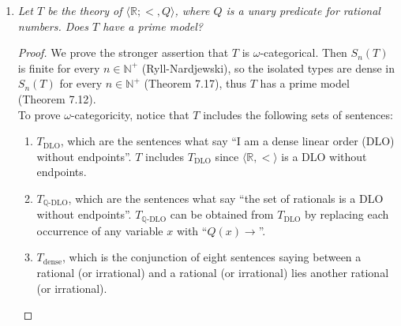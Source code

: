 \documentclass{article}
\begin{document}
\begin{enumerate}[label={\bf Q\arabic*:}]
\begin{proof}
      In particular, we show that $\varphi$ holds in
      $\overline{\mathbb{F}}_p$, the algebraic-closure of the field
      $\mathbb{F}_p$ of $p$ elements. Now \[\overline{\mathbb{F}}_p =
      \bigcup_{n\in\mathbb{N}^+} \mathbb{F}_{p^n},\] where
      $\mathbb{F}_{p^n}$ is the unique (up to ring-isomorphism) field with
      $p^n$ elements that embeds $\mathbb{F}_{p^{n-1}}$. Since each
      $\mathbb{F}_{p^n}$ is finite, $\varphi$ holds in each
      $\mathbb{F}_{p^n}$. So we have a chain of models
      \[\mathbb{F}_{p^1}< \mathbb{F}_{p^2}< \ldots\] of the
      $\forall\exists$-theory $\{\varphi\}$. Then from inductiveness of
      $\{\varphi\}$ (Corollary 11.8), the union $\overline{\mathbb{F}}_p$
      will also be a model of $\{\varphi\}$, thus
      $\overline{\mathbb{F}}_p\models\varphi$, as we wished to show.
    \end{proof}

  \item \it Let $T$ be the theory of $\langle\mathbb{R};<,Q\rangle$, where
    $Q$ is a unary predicate for rational numbers. Does $T$ have a prime
    model?

    \begin{proof}
      We prove the stronger assertion that $T$ is $\omega$-categorical.
      Then $S_n(T)$ is finite for every $n\in\mathbb{N}^+$
      (Ryll-Nardjewski), so the isolated types are dense in $S_n(T)$ for
      every $n\in\mathbb{N}^+$ (Theorem 7.17), thus $T$ has a prime model
      (Theorem 7.12). \\

      To prove $\omega$-categoricity, notice that $T$ includes the
      following sets of sentences:
      \begin{enumerate}
        \item $T_\text{DLO}$, which are the sentences what say ``I am a
          dense linear order (DLO) without endpoints''. $T$ includes
          $T_\text{DLO}$ since $\langle\mathbb{R},<\rangle$ is a DLO
          without endpoints.

        \item $T_{\mathbb{Q}\text{-DLO}}$, which are the sentences what say
          ``the set of rationals is a DLO without endpoints''.
          $T_{\mathbb{Q}\text{-DLO}}$ can be obtained from $T_\text{DLO}$
          by replacing each occurrence of any variable $x$ with
          ``$Q(x)\rightarrow$''.

        \item $T_{\text{dense}}$, which is the conjunction of eight
          sentences saying between a rational (or irrational) and a
          rational (or irrational) lies another rational (or irrational).
      \end{enumerate}


\end{proof}
\end{enumerate}
\end{document}
